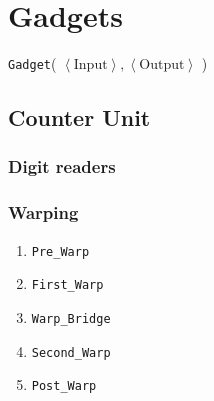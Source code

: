 \section{Gadgets}
\label{gadgets}

{ \tt Gadget}( $\left\langle \text{Input} \right\rangle, \left\langle \text{Output}  \right\rangle$ )

\newcommand{\warpunit}{{\tt Warp\_Unit}}
\newcommand{\prewarp}{{\tt Pre\_Warp}}
\newcommand{\firstwarp}{{\tt First\_Warp}}
\newcommand{\warpbridge}{{\tt Warp\_Bridge}}
\newcommand{\secondwarp}{{\tt Second\_Warp}}
\newcommand{\postwarp}{{\tt Post\_Warp}}

\newcommand{\dtop}{{\tt Digit\_Top}}
\newcommand{\dwriter}{{\tt Digit\_Writer}}
\newcommand{\dreader}{{\tt Digit\_Reader}}

\newcommand{\returnfromdonereadnextrow}{{\tt Return\_From\_Digit1\_Read\_Next\_Row}}
\newcommand{\returnfromdtworeadnextrow}{{\tt Return\_From\_Digit2\_Read\_Next\_Row}}
\newcommand{\returnfromdthreereadnextrow}{{\tt Return\_From\_Digit3\_Read\_Next\_Row}}

\newcommand{\returnfromdonereaddtwo}{{\tt Return\_From\_Digit1\_Read\_Digit2}}
\newcommand{\returnfromdonereaddtwocasetwo}{{\tt Return\_From\_Digit1\_Read\_Digit2\_Case2}}
\newcommand{\returnfromdtworeaddthree}{{\tt Return\_From\_Digit2\_Read\_Digit3}}
\newcommand{\returnfromdthreereaddone}{{\tt Return\_From\_Digit3\_Read\_Digit1}}

\newcommand{\inc}{{\tt carry}}

\newcommand{\dtopdonecasetwo}{{\tt Digit\_Top\_Digit1\_Case2}}
\newcommand{\dtopdtwocasetwo}{{\tt Digit\_Top\_Digit2\_Case2}}
\newcommand{\dtopdthreecasethree}{{\tt Digit\_Top\_Digit3\_Case3}}

\subsection{ Counter Unit }



    \subsubsection{ Digit readers }

    \subsubsection{ Warping }
        \begin{enumerate}

            \item \prewarp

            \item \firstwarp

            \item \warpbridge

            \item \secondwarp

            \item \postwarp

        \end{enumerate}

